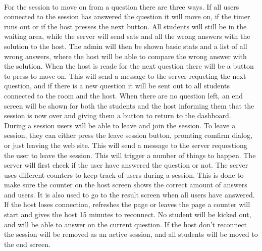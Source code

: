 \\[11pt]
For the session to move on from a question there are three ways. If all users connected to the session has answered the question it will move on, if the timer runs out or if the host presses the next button. All students will still be in the waiting area, while the server will send sats and all the wrong answers with the solution to the host. The admin will then be shown basic stats and a list of all wrong answers, where the host will be able to compare the wrong answer with the solution. When the host is reade for the next question there will be a button to press to move on. This will send a message to the server requeting the next question, and if there is a new question it will be sent out to all students connected to the room and the host. When there are no question left, an end screen will be shown for both the students and the host informing them that the session is now over and giving them a button to return to the dashboard.
\\[11pt]
During a session users will be able to leave and join the session. To leave a session, they can either press the leave session button, promting comfirm dialog, or just leaving the web site. This will send a message to the server requestiong the user to leave the session. This will trigger a number of things to happen. The server will first check if the user have answered the question or not. The server uses different counters to keep track of users during a session. This is done to make sure the counter on the host screen shows the correct amount of answers and users. It is also used to go to the result screen when all users have answered. If the host loses connection, refreshes the page or leaves the page a counter will start and gives the host 15 minutes to reconnect. No student will be kicked out, and will be able to answer on the current question. If the host don't reconnect the session will be removed as an active session, and all students will be moved to the end screen.